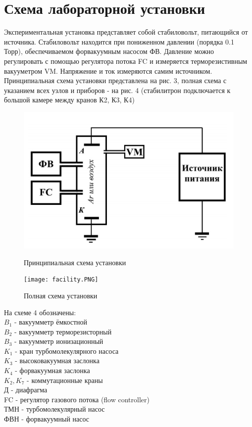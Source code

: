 \documentclass[a4paper]{article}
\begin{document}
\section{Схема лабораторной установки}

Экспериментальная установка представляет собой стабиловольт, питающийся от источника. Стабиловольт находится при пониженном давлении (порядка 0.1 Торр), обеспечиваемом
форвакуумным насосом ФВ. Давление можно регулировать с помощью регулятора потока
FC и измеряется терморезистивным вакууметром VM. Напряжение и ток измеряются самим
источником. Принципиальная схема установки представлена на рис. 3, полная схема с указанием всех узлов и приборов - на рис. 4 (стабилитрон подключается к большой камере между кранов К2, К3, К4)

\begin{figure}[h]
\begin{center}
\begin{minipage}[h]{0.45\linewidth}
\includegraphics[width=1\linewidth]{setup.PNG}
\caption{Принципиальная схема установки} %
\label{ris:experimoriginal} %
\end{minipage}
\hfill 
\begin{minipage}[h]{0.5\linewidth}
\texttt{[image: facility.PNG]}
\caption{Полная схема установки}
\label{ris:experimcoded}
\end{minipage}
\end{center}
\end{figure}


На схеме 4 обозначены: \\
$B_1$ - вакуумметр ёмкостной\\
$B_2$ - вакуумметр терморезисторный\\
$B_3$ - вакуумметр ионизационный\\
$K_1$ - кран турбомолекулярного насоса\\
$K_3$ - высоковакуумная заслонка\\
$K_4$ - форвакуумная заслонка\\
$K_2, K_7$ - коммутационные краны\\
Д - диафрагма\\
FC - регулятор газового потока (flow controller)\\
ТМН - турбомолекулярный насос\\
ФВН - форвакуумный насос\\
\end{document}
